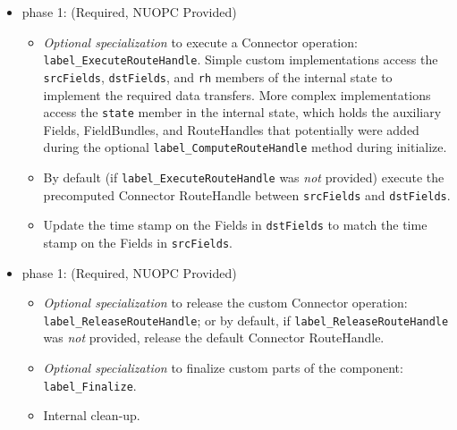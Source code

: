 \begin{itemize}
\item phase 1: ({\sc Required, NUOPC Provided})
  \begin{itemize}
  \item {\it Optional specialization} to execute a Connector operation: {\tt label\_ExecuteRouteHandle}. Simple custom implementations access the {\tt srcFields}, {\tt dstFields}, and {\tt rh} members of the internal state to implement the required data transfers. More complex implementations access the {\tt state} member in the internal state, which holds the auxiliary Fields, FieldBundles, and RouteHandles that potentially were added during the optional {\tt label\_ComputeRouteHandle} method during initialize.
  \item By default (if {\tt label\_ExecuteRouteHandle} was {\em not} provided) execute the precomputed Connector RouteHandle between {\tt srcFields} and {\tt dstFields}.
  \item Update the time stamp on the Fields in {\tt dstFields} to match the time stamp on the Fields in {\tt srcFields}.
  \end{itemize}    
\end{itemize}

\begin{itemize}
\item phase 1: ({\sc Required, NUOPC Provided})
  \begin{itemize}
  \item {\it Optional specialization} to release the custom Connector operation: {\tt label\_ReleaseRouteHandle}; or by default, if {\tt label\_ReleaseRouteHandle} was {\em not} provided, release the default Connector RouteHandle.
  \item {\it Optional specialization} to finalize custom parts of the component: {\tt label\_Finalize}.
  \item Internal clean-up.
  \end{itemize}      
\end{itemize}
